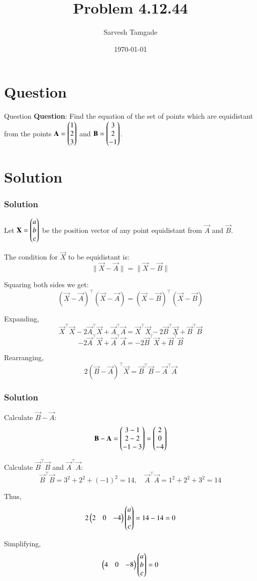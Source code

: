 \documentclass{beamer}
\title{Problem 4.12.44}
\author{Sarvesh Tamgade}
\date{\today}
\numberwithin{equation}{section}
\begin{document}
\begin{frame}
\titlepage
\end{frame}

\section{Question}
\begin{frame}{Question}
\textbf{Question}:
Find the equation of the set of points which are equidistant from the points \(\mathbf{A} = \begin{pmatrix}1 \\ 2 \\ 3\end{pmatrix}\) and \(\mathbf{B} = \begin{pmatrix}3 \\ 2 \\ -1\end{pmatrix}\).

\end{frame}

\section{Solution}
\begin{frame}[fragile]
    \frametitle{Solution}
Let \(\mathbf{X} = \begin{pmatrix}a \\ b \\ c\end{pmatrix}\) be the position vector of any point equidistant from \(\vec{A}\) and \(\vec{B}\).

The condition for \(\vec{X}\) to be equidistant is:
\[
\|\vec{X} - \vec{A}\| = \|\vec{X} - \vec{B}\|
\]

Squaring both sides we get:
\[
(\vec{X} - \vec{A})^\top (\vec{X} - \vec{A}) = (\vec{X} - \vec{B})^\top (\vec{X} - \vec{B})
\]

Expanding,
\[
\vec{X}^\top \vec{X} - 2 \vec{A}^\top \vec{X} + \vec{A}^\top \vec{A} = \vec{X}^\top \vec{X} - 2 \vec{B}^\top \vec{X} + \vec{B}^\top \vec{B}
\]
\[
-2 \vec{A}^\top \vec{X} + \vec{A}^\top \vec{A} = -2 \vec{B}^\top \vec{X} + \vec{B}^\top \vec{B}
\]

Rearranging,
\[
2(\vec{B} - \vec{A})^\top \vec{X} = \vec{B}^\top \vec{B} - \vec{A}^\top \vec{A}
\]


\end{frame}
\begin{frame}[fragile]
    \frametitle{Solution}

Calculate \(\vec{B} - \vec{A}\):
\[
\mathbf{B} - \mathbf{A} = \begin{pmatrix}3 - 1 \\ 2 - 2 \\ -1 - 3\end{pmatrix} = \begin{pmatrix}2 \\ 0 \\ -4\end{pmatrix}
\]

Calculate \(\vec{B}^\top \vec{B}\) and \(\vec{A}^\top \vec{A}\):
\[
\vec{B}^\top \vec{B} = 3^2 + 2^2 + (-1)^2 = 14, \quad
\vec{A}^\top \vec{A} = 1^2 + 2^2 + 3^2 = 14
\]

Thus,
\[
2 \begin{pmatrix}2 & 0 & -4\end{pmatrix} \begin{pmatrix}a \\ b \\ c\end{pmatrix} = 14 - 14 = 0
\]

Simplifying,
\[
\begin{pmatrix}4 & 0 & -8\end{pmatrix} \begin{pmatrix}a \\ b \\ c\end{pmatrix} = 0
\]


\end{frame}
\end{document}
